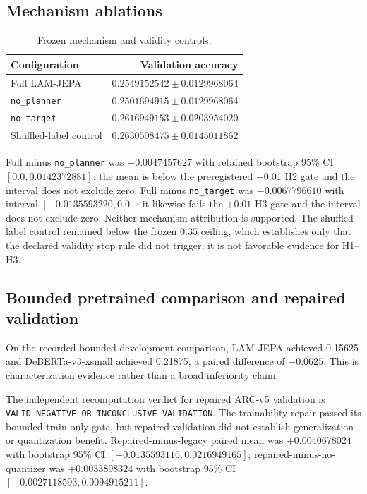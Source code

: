 \documentclass[11pt]{article}
\begin{document}
\subsection{Mechanism ablations}
\begin{table}[h]
\centering
\caption{Frozen mechanism and validity controls.}
\begin{tabular}{lr}
\toprule
Configuration & Validation accuracy \\
\midrule
Full LAM-JEPA & $0.2549152542 \pm 0.0129968064$ \\
\texttt{no\_planner} & $0.2501694915 \pm 0.0129968064$ \\
\texttt{no\_target} & $0.2616949153 \pm 0.0203954020$ \\
Shuffled-label control & $0.2630508475 \pm 0.0145011862$ \\
\bottomrule
\end{tabular}
\end{table}
Full minus \texttt{no\_planner} was $+0.0047457627$ with retained bootstrap 95\% CI $[0.0, 0.0142372881]$: the mean is below the preregistered $+0.01$ H2 gate and the interval does not exclude zero. Full minus \texttt{no\_target} was $-0.0067796610$ with interval $[-0.0135593220,0.0]$: it likewise fails the $+0.01$ H3 gate and the interval does not exclude zero. Neither mechanism attribution is supported. The shuffled-label control remained below the frozen $0.35$ ceiling, which establishes only that the declared validity stop rule did not trigger; it is not favorable evidence for H1--H3.

\subsection{Bounded pretrained comparison and repaired validation}
On the recorded bounded development comparison, LAM-JEPA achieved 0.15625 and DeBERTa-v3-xsmall achieved 0.21875, a paired difference of $-0.0625$. This is characterization evidence rather than a broad inferiority claim.

The independent recomputation verdict for repaired ARC-v5 validation is \texttt{VALID\_NEGATIVE\_OR\_INCONCLUSIVE\_VALIDATION}. The trainability repair passed its bounded train-only gate, but repaired validation did not establish generalization or quantization benefit. Repaired-minus-legacy paired mean was $+0.0040678024$ with bootstrap 95\% CI $[-0.0135593116,0.0216949165]$; repaired-minus-no-quantizer was $+0.0033898324$ with bootstrap 95\% CI $[-0.0027118593,0.0094915211]$.
\end{document}
